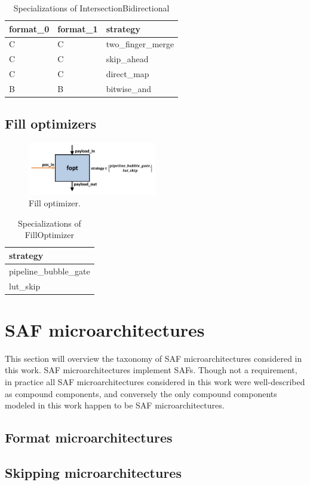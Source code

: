 \begin{table}[H]
\centering
\begin{tabular}{lll}
\toprule
 format\_0   & format\_1   & strategy         \\
\midrule
 C          & C          & two\_finger\_merge \\
 C          & C          & skip\_ahead       \\
 C          & C          & direct\_map       \\
 B          & B          & bitwise\_and      \\
\bottomrule
\end{tabular}
\caption{Specializations of IntersectionBidirectional}
\label{tab:IntersectionBidirectional_specializations}
\end{table}

\subsection{Fill optimizers}

\begin{figure}[H]
    \centering
    \includegraphics[width=0.5\textwidth]{figures/fopt.png}
    \caption{Fill optimizer.}
    \label{fig:fopt}
\end{figure}

\begin{table}[H]
\centering
\begin{tabular}{l}
\toprule
 strategy             \\
\midrule
 pipeline\_bubble\_gate \\
 lut\_skip             \\
\bottomrule
\end{tabular}
\caption{Specializations of FillOptimizer}
\label{tab:FillOptimizer_specializations}
\end{table}

\section{SAF microarchitectures}

This section will overview the taxonomy of SAF microarchitectures considered in this work. SAF microarchitectures implement SAFs. Though not a requirement, in practice all SAF microarchitectures considered in this work were well-described as compound components, and conversely the only compound components modeled in this work happen to be SAF microarchitectures.

\subsection{Format microarchitectures}

\subsection{Skipping microarchitectures}